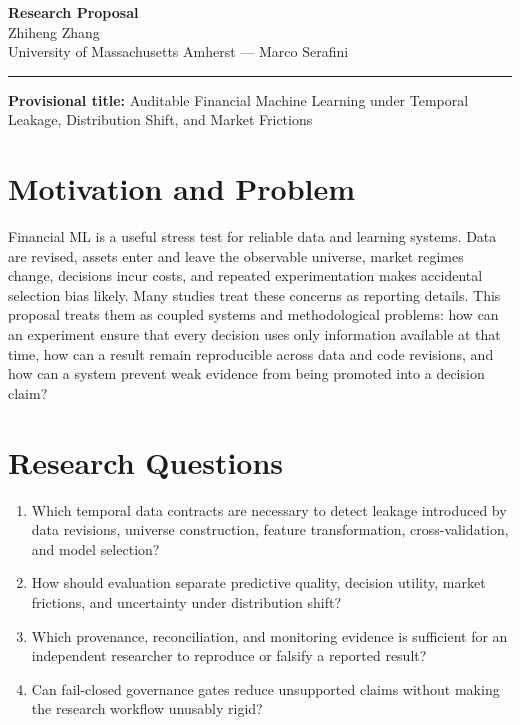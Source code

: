 \documentclass[11pt]{article}
\newcommand{\ApplicantName}{Zhiheng Zhang}
\begin{document}
\begin{center}
{\LARGE\bfseries Research Proposal}\\[0.25em]
{\large \ApplicantName}\\
University of Massachusetts Amherst --- Marco Serafini
\end{center}
\vspace{0.35em}\hrule\vspace{0.65em}

\textbf{Provisional title:} Auditable Financial Machine Learning under Temporal Leakage, Distribution Shift, and Market Frictions

\section*{Motivation and Problem}
Financial ML is a useful stress test for reliable data and learning systems. Data are revised, assets enter and leave the observable universe, market regimes change, decisions incur costs, and repeated experimentation makes accidental selection bias likely. Many studies treat these concerns as reporting details. This proposal treats them as coupled systems and methodological problems: how can an experiment ensure that every decision uses only information available at that time, how can a result remain reproducible across data and code revisions, and how can a system prevent weak evidence from being promoted into a decision claim?

\section*{Research Questions}
\begin{enumerate}
\item Which temporal data contracts are necessary to detect leakage introduced by data revisions, universe construction, feature transformation, cross-validation, and model selection?
\item How should evaluation separate predictive quality, decision utility, market frictions, and uncertainty under distribution shift?
\item Which provenance, reconciliation, and monitoring evidence is sufficient for an independent researcher to reproduce or falsify a reported result?
\item Can fail-closed governance gates reduce unsupported claims without making the research workflow unusably rigid?
\end{enumerate}
\end{document}
